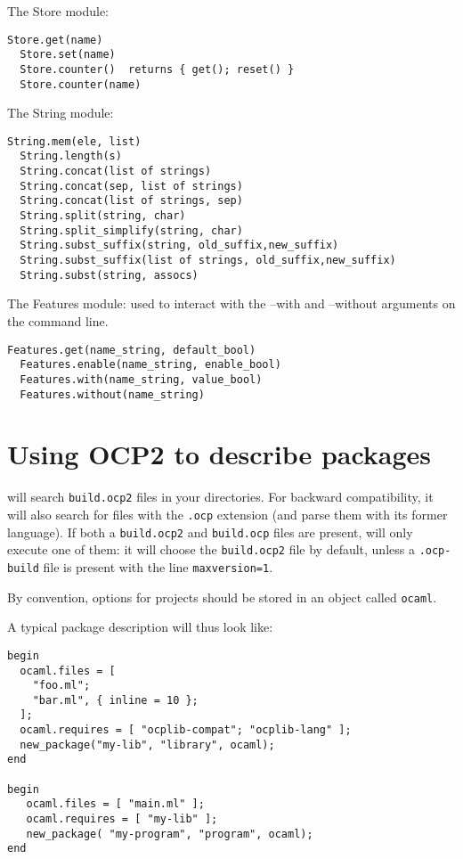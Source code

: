 The {\sf Store} module:
\begin{lstlisting}[language=ocp2]
  Store.get(name)
  Store.set(name)
  Store.counter()  returns { get(); reset() }
  Store.counter(name)
\end{lstlisting}

The {\sf String} module:
\begin{lstlisting}[language=ocp2]
  String.mem(ele, list)
  String.length(s)
  String.concat(list of strings)
  String.concat(sep, list of strings)
  String.concat(list of strings, sep)
  String.split(string, char)
  String.split_simplify(string, char)
  String.subst_suffix(string, old_suffix,new_suffix)
  String.subst_suffix(list of strings, old_suffix,new_suffix)
  String.subst(string, assocs)
\end{lstlisting}

The {\sf Features} module: used to interact with the {\sf --with} and
{\sf --without} arguments on the command line.
\begin{lstlisting}[language=ocp2]
  Features.get(name_string, default_bool)
  Features.enable(name_string, enable_bool)
  Features.with(name_string, value_bool)
  Features.without(name_string)
\end{lstlisting}


\section{Using OCP2 to describe packages}

\ocpbuild{} will search {\tt build.ocp2} files in your
directories. For backward compatibility, it will also search for files
with the {\tt .ocp} extension (and parse them with its former
language). If both a {\tt build.ocp2} and {\tt build.ocp} files are
present, \ocpbuild{} will only execute one of them: it will choose the
{\tt build.ocp2} file by default, unless a {\tt .ocp-build} file is
present with the line {\tt maxversion=1}.

By convention, options for projects should be stored in an object
called {\tt ocaml}.

A typical package description will thus look like:

\begin{verbatim}
begin
  ocaml.files = [
    "foo.ml";
    "bar.ml", { inline = 10 };
  ];
  ocaml.requires = [ "ocplib-compat"; "ocplib-lang" ];
  new_package("my-lib", "library", ocaml);
end

begin
   ocaml.files = [ "main.ml" ];
   ocaml.requires = [ "my-lib" ];
   new_package( "my-program", "program", ocaml);
end
\end{verbatim}

